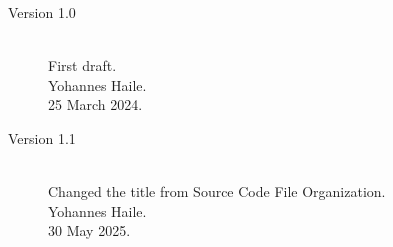 \documentclass{CSSRforAfrica}
\begin{document}
\begin{description}

\item [Version 1.0]~\\
First draft. \\
Yohannes Haile. \\ %
25 March 2024. %

\item [Version 1.1]~\\
Changed the title from Source Code \textrightarrow{} File Organization.\\
Yohannes Haile.  \\
30 May 2025.  
    

\end{description}
\end{document}
